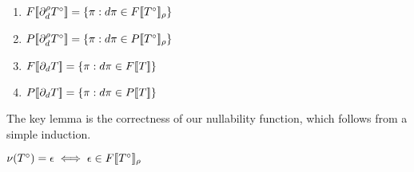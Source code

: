 \begin{theorem}\label{thm:deriv}
 \begin{enumerate}
  \item{$F[\![ \partial_{d}^{\rho}{T^\circ} ]\!] =
    \left\{\pi : d\pi \in
      F[\![ T^\circ ]\!]_{\rho}\right\}$}
  \item{$P[\![ \partial_{d}^{\rho}{T^\circ} ]\!] = \left\{\pi : d\pi \in P[\![ T^\circ ]\!]_{\rho}\right\}$}
  \item{$F[\![ \partial_{d}{T} ]\!] = \left\{\pi : d\pi \in F[\![ T ]\!]\right\}$}
  \item{$P[\![ \partial_{d}{T} ]\!] = \left\{\pi : d\pi \in P[\![ T ]\!]\right\}$}
 \end{enumerate}
\end{theorem}
The key lemma is the correctness of our nullability function, which follows from a simple induction.

\begin{lemma}[Nullability]\label{lem:nullability}
  $\nu(T^\circ) = \epsilon \iff \epsilon \in F[\![ T^\circ ]\!]_{\rho}$
\end{lemma}

